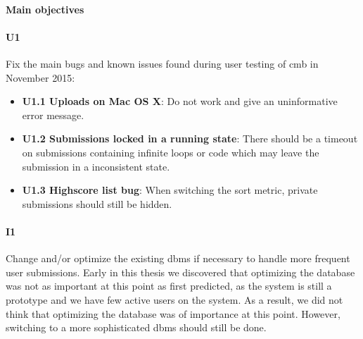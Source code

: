 \paragraph*{Main objectives} \hfill

\paragraph*{U1} Fix the main bugs and known issues found during user testing of \gls{cmb} in November 2015:
  \begin{itemize}
    \item \textbf{U1.1 Uploads on Mac OS X}: Do not work and give an uninformative error message.
    \item \textbf{U1.2 Submissions locked in a running state}: There should be a timeout on submissions containing infinite loops or code which may leave the submission in a inconsistent state.
    \item \textbf{U1.3 Highscore list bug}: When switching the sort metric, private submissions should still be hidden.
  \end{itemize}

\paragraph*{I1} Change and/or optimize the existing \gls{dbms} if necessary to handle more frequent user submissions. Early in this thesis we discovered that optimizing the database was not as important at this point as first predicted, as the system is still a prototype and we have few active users on the system. As a result, we did not think that optimizing the database was of importance at this point. However, switching to a more sophisticated \gls{dbms} should still be done.

